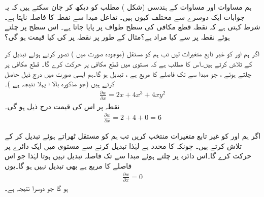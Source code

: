 ہم مساوات  اور مساوات  کے  ہندسی  (شکل )  مطلب کو دیکھ کر جان سکتے ہیں کہ یہ جوابات ایک دوسرے سے مختلف  کیوں ہیں۔ تفاعل  مبدا  سے نقطہ  کا فاصلہ ناپتا ہے۔ شرط  کہتی  ہے کہ نقطہ   قطع مکافی  کی سطح طواف پر پایا جاتا ہے۔  اس سطح پر چلتے ہوئے نقطہ  پر   سے کیا مراد ہے؟مثال کے طور پر نقطہ  پر  کی کیا قیمت ہو گی؟

اگر ہم  اور  کو غیر تابع متغیرات لیں تب ہم   کو مستقل (موجودہ صورت میں )  تصور کرتے ہوئے  تبدیل کر کے   تلاش کرتے ہیں۔اس کا مطلب ہے کہ  مستوی  میں قطع مکافی  پر حرکت کرے گا۔ قطع مکافی پر چلتے ہوئے   ، جو مبدا سے  تک فاصلے کا مربع ہے ، تبدیل ہو گا۔ہم ایسی صورت میں  درج ذیل حاصل کرتے ہیں (جو مذکورہ بالا  ا پہلا نتیجہ ہے )۔
\begin{align*}
\frac{\partial w}{\partial x}=2x+4x^3+4xy^2
\end{align*}
نقطہ  پر اس کی قیمت درج ذیل ہو گی۔
\begin{align*}
\frac{\partial w}{\partial x}=2+4+0=6
\end{align*}

اگر ہم  اور  کو غیر تابع متغیرات منتخب کریں تب ہم  کو مستقل ٹھراتے  ہوئے  تبدیل کر کے  تلاش کرتے ہیں۔ چونکہ  کا  محدد  ہے لہٰذا  تبدیل کرنے سے    مستوی  میں   ایک  دائرے پر حرکت کرے گا۔اس دائرہ پر چلتے ہوئے مبدا سے  تک  فاصلہ تبدیل نہیں ہوتا  لہٰذا  جو اس فاصلے کا مربع ہے بھی تبدیل نہیں ہو گا۔یوں
\begin{align*}
\frac{\partial w}{\partial x}=0
\end{align*}
ہو گا جو دوسرا نتیجہ ہے۔

